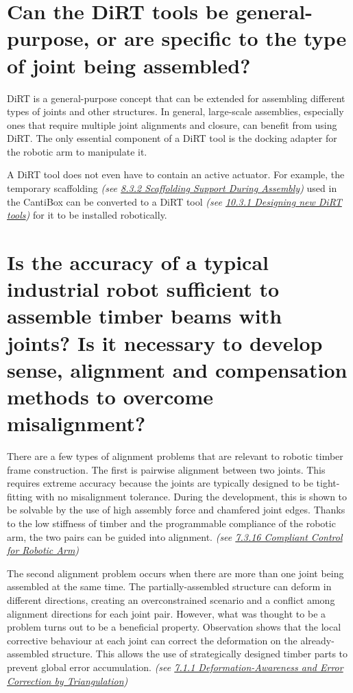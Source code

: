 \documentclass[11pt]{book}
\begin{document}
\section{Can the DiRT tools be general-purpose, or are specific to the type of joint being assembled?}

DiRT is a general-purpose concept that can be extended for assembling different types of joints and other structures. In general, large-scale assemblies, especially ones that require multiple joint alignments and closure, can benefit from using DiRT. The only essential component of a DiRT tool is the docking adapter for the robotic arm to manipulate it. 

A DiRT tool does not even have to contain an active actuator. For example, the temporary scaffolding \textit{(see \uline{8.3.2 Scaffolding Support During Assembly})} used in the CantiBox can be converted to a DiRT tool \textit{(see \uline{10.3.1 Designing new DiRT tools}) }for it to be installed robotically.

\section{Is the accuracy of a typical industrial robot sufficient to assemble timber beams with joints? Is it necessary to develop sense, alignment and compensation methods to overcome misalignment?}

There are a few types of alignment problems that are relevant to robotic timber frame construction. The first is pairwise alignment between two joints. This requires extreme accuracy because the joints are typically designed to be tight-fitting with no misalignment tolerance. During the development, this is shown to be solvable by the use of high assembly force and chamfered joint edges. Thanks to the low stiffness of timber and the programmable compliance of the robotic arm, the two pairs can be guided into alignment. \textit{(see \uline{7.3.16 Compliant Control for Robotic Arm})}

The second alignment problem occurs when there are more than one joint being assembled at the same time. The partially-assembled structure can deform in different directions, creating an overconstrained scenario and a conflict among alignment directions for each joint pair. However, what was thought to be a problem turns out to be a beneficial property. Observation shows that the local corrective behaviour at each joint can correct the deformation on the already-assembled structure. This allows the use of strategically designed timber parts to prevent global error accumulation. \textit{(see \uline{7.1.1 Deformation-Awareness and Error Correction by Triangulation})}
\end{document}
